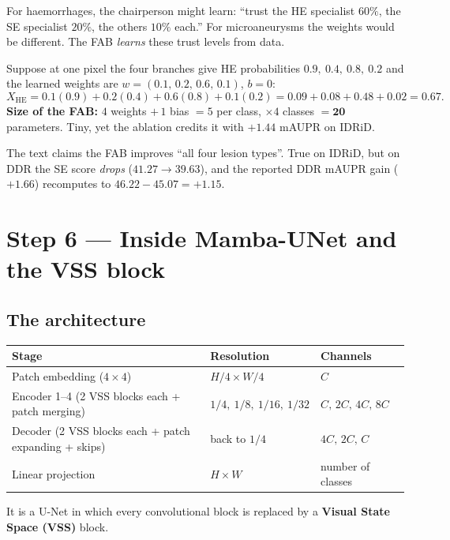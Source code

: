 \documentclass[11pt,a4paper]{article}
\begin{document}
\begin{analogy}
For haemorrhages, the chairperson might learn: ``trust the HE specialist $60\%$, the SE specialist
$20\%$, the others $10\%$ each.'' For microaneurysms the weights would be different. The FAB
\emph{learns} these trust levels from data.
\end{analogy}

\begin{worked}
Suppose at one pixel the four branches give HE probabilities $0.9,\ 0.4,\ 0.8,\ 0.2$ and the learned
weights are $w=(0.1,\,0.2,\,0.6,\,0.1)$, $b=0$:
\[
X_{\text{HE}} = 0.1(0.9)+0.2(0.4)+0.6(0.8)+0.1(0.2)=0.09+0.08+0.48+0.02=0.67 .
\]
\textbf{Size of the FAB:} $4$ weights $+\,1$ bias $=5$ per class, $\times 4$ classes $=\mathbf{20}$
parameters. Tiny, yet the ablation credits it with $+1.44$ mAUPR on IDRiD.
\end{worked}

\begin{careful}
The text claims the FAB improves ``all four lesion types''. True on IDRiD, but on DDR the SE score
\emph{drops} ($41.27\rightarrow39.63$), and the reported DDR mAUPR gain ($+1.66$) recomputes to
$46.22-45.07=+1.15$.
\end{careful}

\section{Step 6 --- Inside Mamba-UNet and the VSS block}
\subsection{The architecture}
\begin{center}
\small
\begin{tabular}{@{}lll@{}}
\toprule
Stage & Resolution & Channels\\
\midrule
Patch embedding ($4\times4$) & $H/4\times W/4$ & $C$\\
Encoder 1--4 (2 VSS blocks each + patch merging) & $1/4,\ 1/8,\ 1/16,\ 1/32$ & $C,\,2C,\,4C,\,8C$\\
Decoder (2 VSS blocks each + patch expanding + skips) & back to $1/4$ & $4C,\,2C,\,C$\\
Linear projection & $H\times W$ & number of classes\\
\bottomrule
\end{tabular}
\end{center}
It is a U-Net in which every convolutional block is replaced by a \textbf{Visual State Space (VSS)}
block.
\end{document}
